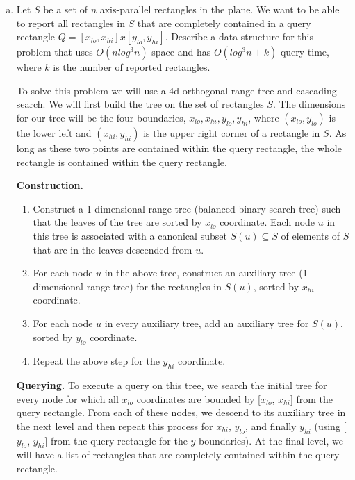 \documentclass[11pt]{article}
\begin{document}
\begin{enumerate}[(a)]\itemsep0pt
  \item
    Let \(S\) be a set of \(n\) axis-parallel rectangles in the plane. We want to be able to
    report all rectangles in \(S\) that are completely contained in a query rectangle \(Q = [x_{lo}, x_{hi}] x [y_{lo}, y_{hi}]\).
    Describe a data structure for this problem that uses \(O(n log^3 n)\)
    space and has \(O(log^3 n + k)\) query time, where \(k\) is the number of reported rectangles.
    
\begin{solution}
To solve this problem we will use a 4d orthogonal range tree and cascading search. We will first build the tree on the set of rectangles \(S\).
The dimensions for our tree will be the four boundaries, \(x_{lo}, x_{hi}, y_{lo}, y_{hi}\), where \((x_{lo}, y_{lo})\) is the lower left and \((x_{hi}, y_{hi})\) is the upper right corner of a rectangle in \(S\).
As long as these two points are contained within the query rectangle, the whole rectangle is contained within the query rectangle.

\textbf{Construction.}
\begin{enumerate}[1.]
  \item
    Construct a 1-dimensional range tree (balanced binary search tree) such that the leaves of the tree are sorted by \(x_{lo}\) coordinate.
    Each node \(u\) in this tree is associated with a canonical subset \(S(u) \subseteq S\) of elements of \(S\) that are in the leaves descended from \(u\).
  \item
    For each node \(u\) in the above tree, construct an auxiliary tree (1-dimensional range tree) for the rectangles in \(S(u)\), sorted by \(x_{hi}\) coordinate.
  \item
    For each node \(u\) in every auxiliary tree, add an auxiliary tree for \(S(u)\), sorted by \(y_{lo}\) coordinate.
  \item
    Repeat the above step for the \(y_{hi}\) coordinate.
\end{enumerate}

\textbf{Querying.}
To execute a query on this tree, we search the initial tree for every node for which all \(x_{lo}\) coordinates are bounded by [\(x_{lo}\), \(x_{hi}\)] from the query rectangle.
From each of these nodes, we descend to its auxiliary tree in the next level and then repeat this process for \(x_{hi}\), \(y_{lo}\), and finally \(y_{hi}\)
(using [\(y_{lo}\), \(y_{hi}\)] from the query rectangle for the \(y\) boundaries). At the final level, we will have a list of rectangles that are completely contained
within the query rectangle.


\end{solution}
\end{enumerate}
\end{document}

